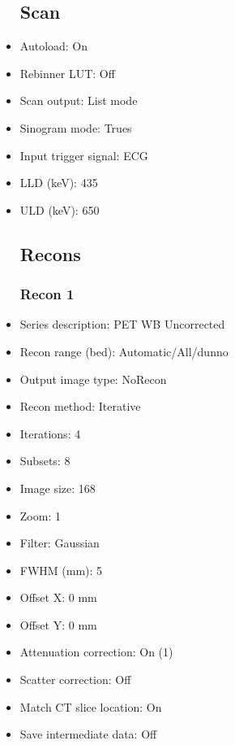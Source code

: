 \documentclass[12pt]{article}
\begin{document}
\begin{itemize}
\subsection{Scan}
\item Autoload: On
\item Rebinner LUT: Off
\item Scan output: List mode
\item Sinogram mode: Trues
\item Input trigger signal: ECG
\item LLD (keV): 435
\item ULD (keV): 650
\subsection{Recons}
\subsubsection{Recon 1}
\item Series description: PET WB Uncorrected
\item Recon range (bed): Automatic/All/dunno
\item Output image type: NoRecon
\item Recon method: Iterative
\item Iterations: 4
\item Subsets: 8
\item Image size: 168
\item Zoom: 1
\item Filter: Gaussian
\item FWHM (mm): 5
\item Offset X: 0 mm
\item Offset Y: 0 mm
\item Attenuation correction: On (1)
\item Scatter correction: Off
\item Match CT slice location: On
\item Save intermediate data: Off
\end{itemize}
\end{document}
